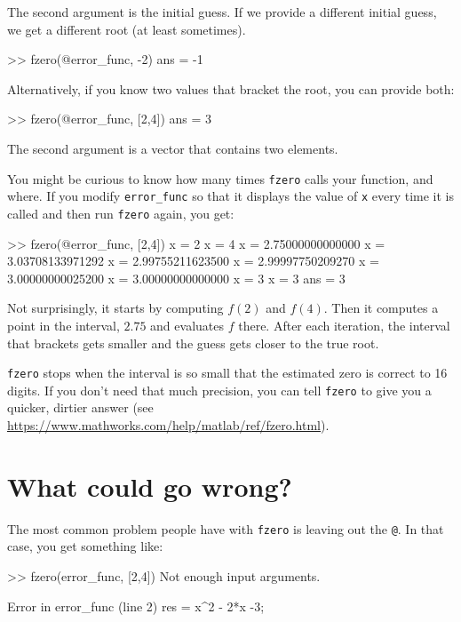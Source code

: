 \documentclass[
]{book}
\numberwithin{Answer}{chapter}
\numberwithin{Exercise}{chapter}
\begin{document}

The second argument is the initial guess.  If we provide a different
initial guess, we get a different root (at least sometimes).

\begin{code}
>> fzero(@error_func, -2)
ans = -1
\end{code}

Alternatively, if you know two values that bracket the root,
you can provide both:

\begin{code}
>> fzero(@error_func, [2,4])
ans = 3
\end{code}

The second argument is a vector that contains two elements.  

You might be curious to know how many times {\tt fzero} calls your
function, and where.  If you modify {\tt error\_func} so that it displays
the value of {\tt x} every time it is called and then run {\tt fzero}
again, you get:

\begin{code}
>> fzero(@error_func, [2,4])
x = 2
x = 4
x = 2.75000000000000
x = 3.03708133971292
x = 2.99755211623500
x = 2.99997750209270
x = 3.00000000025200
x = 3.00000000000000
x = 3
x = 3
ans = 3
\end{code}

Not surprisingly, it starts by computing $f(2)$ and $f(4)$.  Then it computes a point in the interval, $2.75$ and evaluates $f$ there.  After each iteration, the interval that brackets gets smaller and the guess gets closer to the true root.

{\tt fzero} stops when the interval is so small that the estimated
zero is correct to 16 digits.  If you
don't need that much precision, you can tell {\tt fzero} to give
you a quicker, dirtier answer (see \url{https://www.mathworks.com/help/matlab/ref/fzero.html}).


\section{What could go wrong?}

The most common problem people have with {\tt fzero} is leaving
out the {\tt @}.  In that case, you get something like:

\begin{code}
>> fzero(error_func, [2,4])
Not enough input arguments.

Error in error_func (line 2)
    res = x^2 - 2*x -3;
\end{code}
\end{document}
